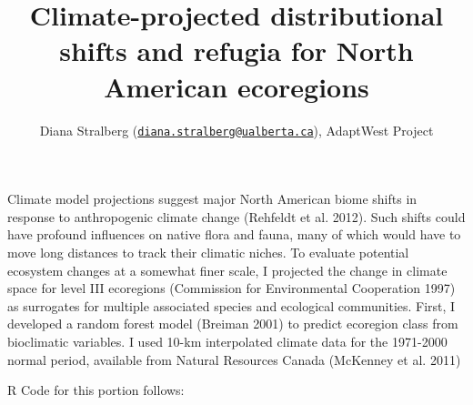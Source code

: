 \documentclass[]{article}
\title{Climate-projected distributional shifts and refugia for North American
ecoregions}
\author{Diana Stralberg
(\href{mailto:diana.stralberg@ualberta.ca}{\nolinkurl{diana.stralberg@ualberta.ca}}),
AdaptWest Project}
\date{}
\begin{document}
\maketitle

Climate model projections suggest major North American biome shifts in
response to anthropogenic climate change (Rehfeldt et al. 2012). Such
shifts could have profound influences on native flora and fauna, many of
which would have to move long distances to track their climatic niches.
To evaluate potential ecosystem changes at a somewhat finer scale, I
projected the change in climate space for level III ecoregions
(Commission for Environmental Cooperation 1997) as surrogates for
multiple associated species and ecological communities. First, I
developed a random forest model (Breiman 2001) to predict ecoregion
class from bioclimatic variables. I used 10-km interpolated climate data
for the 1971-2000 normal period, available from Natural Resources Canada
(McKenney et al. 2011)

R Code for this portion follows:
\end{document}
